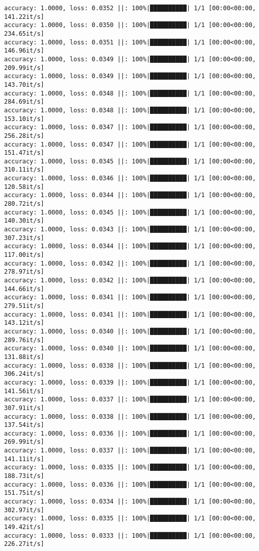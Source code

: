 \documentclass[
]{article}
\begin{document}
\begin{verbatim}
accuracy: 1.0000, loss: 0.0352 ||: 100%|██████████| 1/1 [00:00<00:00, 141.22it/s]
accuracy: 1.0000, loss: 0.0350 ||: 100%|██████████| 1/1 [00:00<00:00, 234.65it/s]
accuracy: 1.0000, loss: 0.0351 ||: 100%|██████████| 1/1 [00:00<00:00, 146.96it/s]
accuracy: 1.0000, loss: 0.0349 ||: 100%|██████████| 1/1 [00:00<00:00, 209.99it/s]
accuracy: 1.0000, loss: 0.0349 ||: 100%|██████████| 1/1 [00:00<00:00, 143.70it/s]
accuracy: 1.0000, loss: 0.0348 ||: 100%|██████████| 1/1 [00:00<00:00, 284.69it/s]
accuracy: 1.0000, loss: 0.0348 ||: 100%|██████████| 1/1 [00:00<00:00, 153.10it/s]
accuracy: 1.0000, loss: 0.0347 ||: 100%|██████████| 1/1 [00:00<00:00, 256.28it/s]
accuracy: 1.0000, loss: 0.0347 ||: 100%|██████████| 1/1 [00:00<00:00, 151.47it/s]
accuracy: 1.0000, loss: 0.0345 ||: 100%|██████████| 1/1 [00:00<00:00, 310.11it/s]
accuracy: 1.0000, loss: 0.0346 ||: 100%|██████████| 1/1 [00:00<00:00, 120.58it/s]
accuracy: 1.0000, loss: 0.0344 ||: 100%|██████████| 1/1 [00:00<00:00, 280.72it/s]
accuracy: 1.0000, loss: 0.0345 ||: 100%|██████████| 1/1 [00:00<00:00, 140.30it/s]
accuracy: 1.0000, loss: 0.0343 ||: 100%|██████████| 1/1 [00:00<00:00, 307.23it/s]
accuracy: 1.0000, loss: 0.0344 ||: 100%|██████████| 1/1 [00:00<00:00, 117.00it/s]
accuracy: 1.0000, loss: 0.0342 ||: 100%|██████████| 1/1 [00:00<00:00, 278.97it/s]
accuracy: 1.0000, loss: 0.0342 ||: 100%|██████████| 1/1 [00:00<00:00, 144.66it/s]
accuracy: 1.0000, loss: 0.0341 ||: 100%|██████████| 1/1 [00:00<00:00, 279.51it/s]
accuracy: 1.0000, loss: 0.0341 ||: 100%|██████████| 1/1 [00:00<00:00, 143.12it/s]
accuracy: 1.0000, loss: 0.0340 ||: 100%|██████████| 1/1 [00:00<00:00, 289.76it/s]
accuracy: 1.0000, loss: 0.0340 ||: 100%|██████████| 1/1 [00:00<00:00, 131.88it/s]
accuracy: 1.0000, loss: 0.0338 ||: 100%|██████████| 1/1 [00:00<00:00, 306.24it/s]
accuracy: 1.0000, loss: 0.0339 ||: 100%|██████████| 1/1 [00:00<00:00, 141.56it/s]
accuracy: 1.0000, loss: 0.0337 ||: 100%|██████████| 1/1 [00:00<00:00, 307.91it/s]
accuracy: 1.0000, loss: 0.0338 ||: 100%|██████████| 1/1 [00:00<00:00, 137.54it/s]
accuracy: 1.0000, loss: 0.0336 ||: 100%|██████████| 1/1 [00:00<00:00, 269.99it/s]
accuracy: 1.0000, loss: 0.0337 ||: 100%|██████████| 1/1 [00:00<00:00, 141.11it/s]
accuracy: 1.0000, loss: 0.0335 ||: 100%|██████████| 1/1 [00:00<00:00, 188.73it/s]
accuracy: 1.0000, loss: 0.0336 ||: 100%|██████████| 1/1 [00:00<00:00, 151.75it/s]
accuracy: 1.0000, loss: 0.0334 ||: 100%|██████████| 1/1 [00:00<00:00, 302.97it/s]
accuracy: 1.0000, loss: 0.0335 ||: 100%|██████████| 1/1 [00:00<00:00, 149.42it/s]
accuracy: 1.0000, loss: 0.0333 ||: 100%|██████████| 1/1 [00:00<00:00, 226.27it/s]

\end{verbatim}
\end{document}
